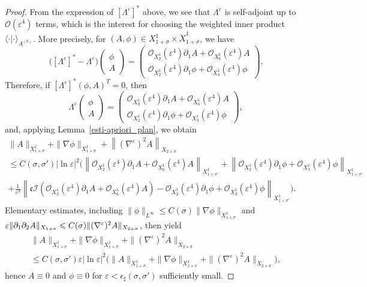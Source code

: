 \documentclass[10pt]{amsart}
\theoremstyle{definition}\newtheorem{defi}[theo]{Definition}\newtheorem{rema}[theo]{Remark}\newtheorem{exam}[theo]{Example}\newtheorem{exem}[theo]{Example}\newtheorem{nota}[theo]{Notation}
\newcommand*\p{\partial}
\newcommand*\BO{\mathcal{O}}
\newcommand*\BI{\mathcal{I}}
\newcommand*\cs{{\mathfrak c}}
\newcommand*\ii{\infty}
\newcommand*\ls{\leqslant }
\newcommand*\e{\varepsilon}
\newcommand*\ep{\epsilon}
\newcommand*\lne{\lvert \ln \varepsilon \rvert}
\newcommand*\s{\sigma}
\begin{document}
\begin{proof}
From the expression of $ [\Lambda^\e]^* $ above, we see that $ \Lambda^\e $ is self-adjoint up to $ \BO(\e^4) $ terms, which is the interest for choosing the weighted inner product $ \langle \cdot | \cdot \rangle_{A^{(0)}} $. More precisely, for $ (A, \phi) \in X^1_{1+\s} \times \dot{X}^1_{1+\s} $, we have
\begin{equation}\label{diff_adj}
\Big([\Lambda^\e]^* - \Lambda^\e \Big)
\begin{pmatrix}
\phi \\ A
\end{pmatrix} =
\begin{pmatrix}
\BO_{X^1_2} (\e^4) \p_1 A + \BO_{X^1_6} (\e^4) A
\\
\BO_{X^1_2} (\e^4) \p_1 \phi + \BO_{X^1_3} (\e^4) \phi
\end{pmatrix}.
\end{equation}
Therefore, if $ [\Lambda^\e]^* (\phi, A)^T = 0 $, then
\begin{equation*}
\Lambda^\e
\begin{pmatrix}
\phi \\ A
\end{pmatrix} =
\begin{pmatrix}
\BO_{X^1_2} (\e^4) \p_1 A + \BO_{X^1_6} (\e^4) A
\\
\BO_{X^1_2} (\e^4) \p_1 \phi + \BO_{X^1_3} (\e^4) \phi
\end{pmatrix},
\end{equation*}
and, applying Lemma~\ref{esti-apriori_plan}, we obtain
\begin{multline*}
\| A \|_{X^1_{1+\s} } + \| \nabla \phi \|_{X^1_{1+\s} } + \left\| (\nabla^\e)^2 A\right\|_{X_{2+\s}}
\\
\ls C(\s, \s') \lne^2 \Big(\left\| \BO_{X^1_2} (\e^4) \p_1 A + \BO_{X^1_6} (\e^4) A \right\|_{X^1_{1+\s'} } + \left\| \BO_{X^1_2} (\e^4) \p_1 \phi + \BO_{X^1_3} (\e^4) \phi \right\|_{X^1_{1+\s'} }
\\
+ \frac{1}{\e^2} \left\| \cs \BI (\BO_{X^1_2} (\e^4) \p_1 A + \BO_{X^1_6} (\e^4) A) - \BO_{X^1_2} (\e^4) \p_1 \phi + \BO_{X^1_3} (\e^4) \phi \right\|_{X^1_{1+\s'}} \bigg).
\end{multline*}
Elementary estimates, including $ \| \phi \|_{L^\ii} \ls C(\s) \| \nabla \phi \|_{X^1_{1+\s} } $ and $ \e \| \p_1 \p_2 A \|_{X_{1+\s}}\linebreak \ls C(\s) \| (\nabla^\e)^2 A \|_{X_{2+\s}} $, then yield
\begin{multline*}
\| A \|_{X^1_{1+\s} } + \| \nabla \phi \|_{X^1_{1+\s} } + \| (\nabla^\e)^2 A \|_{X_{2+\s}}
\\  \ls C(\s, \s') \e \lne^2 \Big(\| A \|_{X^1_{1+\s} } + \| \nabla \phi \|_{X^1_{1+\s} } + \| (\nabla^\e)^2 A \|_{X_{2+\s}} \Big),
\end{multline*}
hence $ A \equiv 0 $ and $ \phi \equiv 0 $ for $ \e < \ep_\sharp (\s, \s') $ sufficiently small.
\end{proof}
\end{document}
